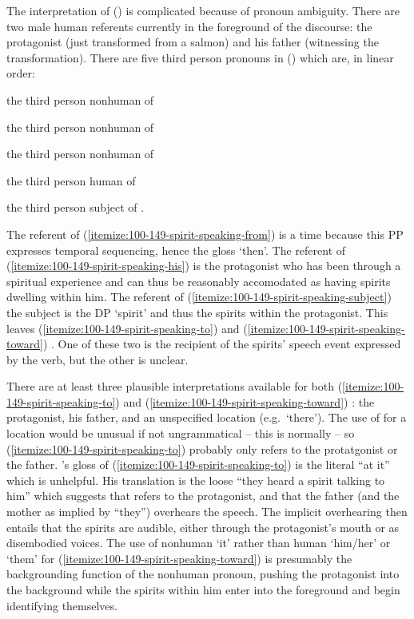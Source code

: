 The interpretation of (\lastx) is complicated because of pronoun ambiguity.
There are two male human referents currently in the foreground of the discourse: the protagonist (just transformed from a salmon) and his father (witnessing the transformation).
There are five third person pronouns in (\lastx) which are, in linear order:
\begin{inlineenum}[label=(\alph*), ref=\alph*]
\item\label{itemize:100-149-spirit-speaking-from}%
		the third person nonhuman of 
\item\label{itemize:100-149-spirit-speaking-to}%
		the third person nonhuman of 
\item\label{itemize:100-149-spirit-speaking-toward}%
		the third person nonhuman of 
\item\label{itemize:100-149-spirit-speaking-his}%
		the third person human of 
\item\label{itemize:100-149-spirit-speaking-subject}%
		the third person subject of .
\end{inlineenum}
The referent of (\ref{itemize:100-149-spirit-speaking-from})  is a time because this PP expresses temporal sequencing, hence the gloss ‘then’.
The referent of (\ref{itemize:100-149-spirit-speaking-his})  is the protagonist who has been through a spiritual experience and can thus be reasonably accomodated as having spirits dwelling within him.
The referent of (\ref{itemize:100-149-spirit-speaking-subject}) the subject is the DP  ‘spirit’ and thus the spirits within the protagonist. 
This leaves (\ref{itemize:100-149-spirit-speaking-to})  and (\ref{itemize:100-149-spirit-speaking-toward}) .
One of these two is the recipient of the spirits’ speech event expressed by the verb, but the other is unclear.

There are at least three plausible interpretations available for both (\ref{itemize:100-149-spirit-speaking-to})  and (\ref{itemize:100-149-spirit-speaking-toward}) : the protagonist, his father, and an unspecified location (e.g.\ ‘there’).
The use of  for a location would be unusual if not ungrammatical – this is normally  – so (\ref{itemize:100-149-spirit-speaking-to})  probably only refers to the protatgonist or the father.
\citeauthor{swanton:1909}’s gloss of (\ref{itemize:100-149-spirit-speaking-to})  is the literal “at it” which is unhelpful.
His translation is the loose “they heard a spirit talking to him” which suggests that  refers to the protagonist, and that the father (and the mother as implied by “they”)  overhears the speech.
The implicit overhearing then entails that the spirits are audible, either through the protagonist’s mouth or as disembodied voices.
The use of nonhuman  ‘it’ rather than human  ‘him/her’ or  ‘them’ for (\ref{itemize:100-149-spirit-speaking-toward})  is presumably the backgrounding function of the nonhuman pronoun, pushing the protagonist into the background while the spirits within him enter into the foreground and begin identifying themselves.

